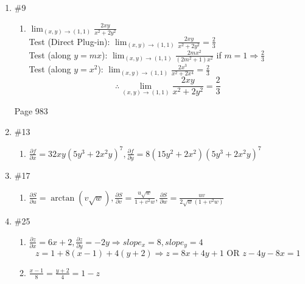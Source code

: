 \documentclass[12pt]{article}
\begin{document}
\begin{enumerate}
    \item \#9

    \begin{enumerate}

      \item $\lim_{(x,y)\to(1,1)}\frac{2xy}{x^2+2y^2}$ \\
        Test (Direct Plug-in): $\lim_{(x,y)\to(1,1)}\frac{2xy}{x^2+2y^2}=\frac{2}{3}$\\
        Test (along $y=mx$): $\lim_{(x,y)\to(1,1)}\frac{2mx^2}{(2m^2+1)x^2}$ if $m=1\Longrightarrow \frac{2}{3}$\\
        Test (along $y=x^2$): $\lim_{(x,y)\to(1,1)}\frac{2x^3}{x^2+2x^4}=\frac{2}{3}$
        $$\therefore\lim_{(x,y)\to(1,1)}\frac{2xy}{x^2+2y^2}=\frac{2}{3}$$

    \end{enumerate}

    \begin{center}

Page 983

    \end{center}


    \item \#13 \begin{enumerate}

        \item $\frac{\partial f}{\partial x} = 32xy(5y^3+2x^2y)^7, \frac{\partial f}{\partial y} = 8(15y^2+2x^2)(5y^3+2x^2y)^7$ 

\end{enumerate}

    \item \#17 \begin{enumerate}

        \item $\frac{\partial S}{\partial u}=\arctan(v\sqrt{w}), \frac{\partial S}{\partial v} = \frac{u\sqrt{w}}{1+v^2w}, \frac{\partial S}{\partial w} = \frac{uv}{2\sqrt{w}(1+v^2w)}$

    \end{enumerate}

  \item \#25 \begin{enumerate}

      \item $\frac{\partial z}{\partial x}=6x+2, \frac{\partial z}{\partial y}=-2y\Longrightarrow slope_x=8, slope_y=4$
        $$z=1+8(x-1)+4(y+2)\Longrightarrow z=8x+4y+1\text{ OR } z-4y-8x=1$$
      \item $\frac{x-1}{8}=\frac{y+2}{4}=1-z$


\end{enumerate}
\end{enumerate}
\end{document}
